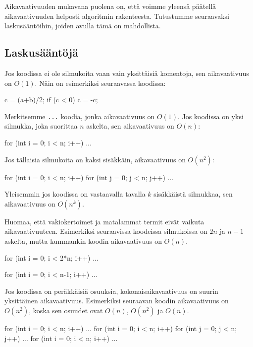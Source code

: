 Aikavaativuuden mukavana puolena on, että voimme yleensä
päätellä aikavaativuuden helposti algoritmin
rakenteesta. Tutustumme seuraavaksi laskusääntöihin,
joiden avulla tämä on mahdollista.

\subsection{Laskusääntöjä}

Jos koodissa ei ole silmukoita vaan vain
yksittäisiä komentoja, sen aikavaativuus on $O(1)$.
Näin on esimerkiksi seuraavassa koodissa:

\begin{code}
c = (a+b)/2;
if (c < 0) c = -c;
\end{code}

Merkitsemme \texttt{...} koodia,
jonka aikavaativuus on $O(1)$.
Jos koodissa on yksi silmukka,
joka suorittaa $n$ askelta,
sen aikavaativuus on $O(n)$:

\begin{code}
for (int i = 0; i < n; i++) {
    ...
}
\end{code}

Jos tällaisia silmukoita on kaksi sisäkkäin,
aikavaativuus on $O(n^2)$:

\begin{code}
for (int i = 0; i < n; i++) {
    for (int j = 0; j < n; j++) {
        ...
    }
}
\end{code}

Yleisemmin jos koodissa on vastaavalla tavalla
$k$ sisäkkäistä silmukkaa, sen aikavaativuus on $O(n^k)$.

Huomaa, että vakiokertoimet ja matalammat termit eivät vaikuta aikavaativuuteen.
Esimerkiksi seuraavissa koodeissa silmukoissa on $2n$ ja $n-1$ askelta,
mutta kummankin koodin aikavaativuus on $O(n)$.

\begin{code}
for (int i = 0; i < 2*n; i++) {
    ...
}
\end{code}

\begin{code}
for (int i = 0; i < n-1; i++) {
    ...
}
\end{code}

Jos koodissa on peräkkäisiä osuuksia, kokonaisaikavaativuus on suurin
yksittäinen aikavaativuus. Esimerkiksi seuraavan koodin aikavaativuus on $O(n^2)$,
koska sen osuudet ovat $O(n)$, $O(n^2)$ ja $O(n)$.

\begin{code}
for (int i = 0; i < n; i++) {
    ...
}
for (int i = 0; i < n; i++) {
    for (int j = 0; j < n; j++) {
        ...
    }
}
for (int i = 0; i < n; i++) {
    ...
}
\end{code}

